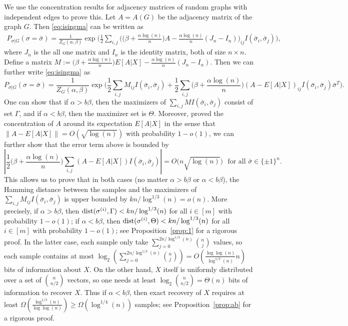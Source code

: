 \documentclass{article}
\begin{document}
We use the concentration results for adjacency matrices of random graphs with independent edges to prove this. Let $A=A(G)$ be the adjacency matrix of the graph $G$. Then \eqref{eq:isingma} can be written as
\begin{align*}
 P_{\sigma|G}(\sigma=\bar{\sigma})  
=  \frac{1}{Z_G(\alpha,\beta)}
\exp\Big( \frac{1}{2} \sum_{i,j}\Big( \big(\beta+\frac{\alpha\log(n)}{n} \big) A
-\frac{\alpha\log(n)}{n} (J_n-I_n) \Big)_{ij} I(\bar{\sigma}_i,\bar{\sigma}_j) 
\Big)  ,
\end{align*}
where $J_n$ is the all one matrix and $I_n$ is the identity matrix, both of size $n\times n$.
Define a matrix
$
M:= \big(\beta+\frac{\alpha\log(n)}{n} \big) E[A|X]
-\frac{\alpha\log(n)}{n} (J_n-I_n).
$
Then we can further write \eqref{eq:isingma}
as
$$
P_{\sigma|G}(\sigma=\bar{\sigma})
= \frac{1}{Z_G(\alpha,\beta)}
\exp\Big( \frac{1}{2} \sum_{i,j} M_{ij} I(\bar{\sigma}_i, \bar{\sigma}_j) + \frac{1}{2} \sum_{i,j}\big(\beta+\frac{\alpha\log(n)}{n} \big)  (A-E[A|X])_{ij} I(\bar{\sigma}_i, \bar{\sigma}_j) 
  \bar{\sigma}^T 
\Big)  .
$$
One can show that if $\alpha>b\beta$, then the maximizers of $\sum_{i,j} M I(\bar{\sigma}_i, \bar{\sigma}_j)$ consist of set $\Gamma$, and if $\alpha<b\beta$, then the maximizer set is $\Theta$.
Moreover, \cite{Hajek16} proved the concentration of $A$ around its expectation $E[A|X]$ in the sense that
$\|A-E[A|X]\| = O(\sqrt{\log(n)})$ with probability $1-o(1)$, we can further show that the error term above is bounded by
$$
\left|\frac{1}{2} \big(\beta+\frac{\alpha\log(n)}{n} \big)\sum_{i,j} (A-E[A|X])
 I( \bar{\sigma}_i, \bar{\sigma}_j) \right| = O \big( n \sqrt{\log(n)} \big)
  \text{~~for all~} \bar{\sigma}\in\{\pm 1\}^n  .
$$
This allows us to prove that in both cases (no matter $\alpha>b\beta$ or $\alpha<b\beta$), the Hamming distance between the samples and the maximizers of $\sum_{i,j}  M_{ij}I(\bar{\sigma}_i, \bar{\sigma}_j)$ is upper bounded by $kn/\log^{1/3}(n)=o(n)$.
More precisely, if $\alpha>b\beta$, then $\operatorname{dist}(\sigma^{(i)},\Gamma )< kn/\log^{1/3}(n)$ for all $i\in[m]$ with probability $1-o(1)$; if $\alpha<b\beta$, then $\operatorname{dist}(\sigma^{(i)}, \Theta)< kn/\log^{1/3}(n)$ for all $i\in[m]$ with probability $1-o(1)$; see Proposition~\ref{prop:1} for a rigorous proof.
In the latter case, each sample only take $\sum_{j=0}^{2n/\log^{1/3}(n)}\binom{n}{j}$ values, so each sample contains at most $\log_2(\sum_{j=0}^{2n/\log^{1/3}(n)}\binom{n}{j})=O(\frac{\log\log(n)}{\log^{1/3}(n)} n)$ bits of information about $X$. On the other hand, $X$ itself is uniformly distributed over a set of $\binom{n}{n/2}$ vectors, so one needs at least $\log_2\binom{n}{n/2}=\Theta(n)$ bits of information to recover $X$. Thus if $\alpha<b\beta$, then exact recovery of $X$ requires at least $\Omega(\frac{\log^{1/3}(n)}{\log\log(n)})\ge \Omega(\log^{1/4}(n))$ samples; see Proposition~\ref{prop:ab} for a rigorous proof.
\end{document}
